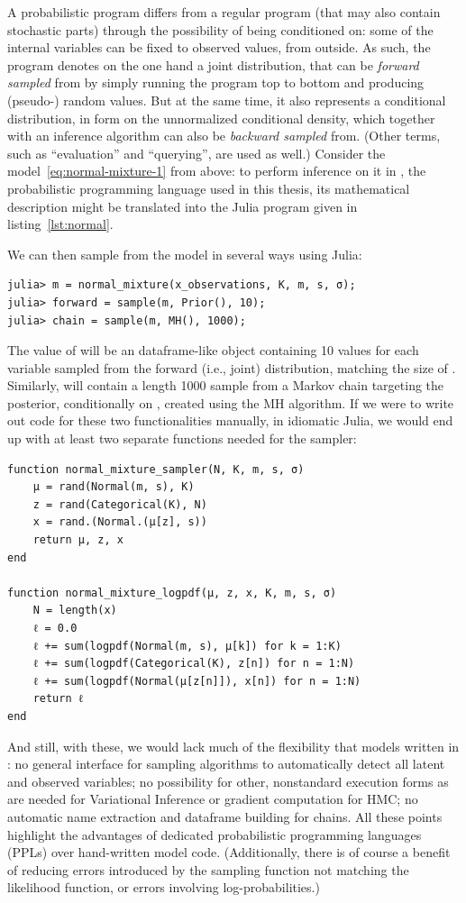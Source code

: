 A probabilistic program differs from a regular program (that may also contain stochastic parts)
through the possibility of being conditioned on: some of the internal variables can be fixed to
observed values, from outside. As such, the program denotes on the one hand a joint distribution,
that can be \emph{forward sampled} from by simply running the program top to bottom and producing
(pseudo-) random values.  But at the same time, it also represents a conditional distribution, in
form on the unnormalized conditional density, which together with an inference algorithm can also be
\emph{backward sampled} from.  (Other terms, such as \enquote{evaluation} and \enquote{querying},
are used as well.)  Consider the model~\eqref{eq:normal-mixture-1} from above: to perform inference
on it in \turingjl{} \parencite{ge2018turing}, the probabilistic programming language used in this
thesis, its mathematical description might be translated into the Julia program given in
listing~\ref{lst:normal}.

We can then sample from the model in several ways using Julia:
\begin{lstlisting}
julia> m = normal_mixture(x_observations, K, m, s, σ);
julia> forward = sample(m, Prior(), 10);
julia> chain = sample(m, MH(), 1000);
\end{lstlisting}
The value of  will be an dataframe-like object containing 10 values for each variable
sampled from the forward (i.e., joint) distribution, matching the size of .
Similarly,  will contain a length 1000 sample from a Markov chain targeting the
posterior, conditionally on , created using the MH algorithm.  If we were to
write out code for these two functionalities manually, in idiomatic Julia, we would end up with at
least two separate functions needed for the sampler:
\begin{lstlisting}
function normal_mixture_sampler(N, K, m, s, σ)
    μ = rand(Normal(m, s), K)
    z = rand(Categorical(K), N)
    x = rand.(Normal.(μ[z], s))
    return μ, z, x
end

function normal_mixture_logpdf(μ, z, x, K, m, s, σ)
    N = length(x)
    ℓ = 0.0
    ℓ += sum(logpdf(Normal(m, s), μ[k]) for k = 1:K)
    ℓ += sum(logpdf(Categorical(K), z[n]) for n = 1:N)
    ℓ += sum(logpdf(Normal(μ[z[n]]), x[n]) for n = 1:N)
    return ℓ
end
\end{lstlisting}
And still, with these, we would lack much of the flexibility that models written in \turingjl: no
general interface for sampling algorithms to automatically detect all latent and observed variables;
no possibility for other, nonstandard execution forms as are needed for Variational Inference or
gradient computation for HMC; no automatic name extraction and dataframe building for chains.  All
these points highlight the advantages of dedicated probabilistic programming languages (PPLs) over
hand-written model code.  (Additionally, there is of course a benefit of reducing errors introduced
by the sampling function not matching the likelihood function, or errors involving
log-probabilities.)

